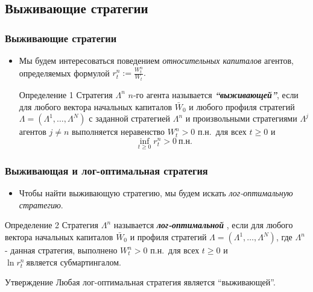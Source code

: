 \documentclass[aspectratio=169]{beamer}
\theoremstyle{definition}
\theoremstyle{remark}
\begin{document}
\subsection{Выживающие стратегии}
\begin{frame}\frametitle{Выживающие стратегии}
    \begin{itemize}
	\item Мы будем интересоваться поведением \textit{относительных капиталов} агентов, определяемых формулой $r_t^n := \frac{W_t^n}{W_t}.$

	\begin{block}{Определение 1}
    Стратегия $\Lambda^n$ $n$-го агента называется \emph{\bf ``выживающей''}, если для любого вектора начальных капиталов $\bar W_0$ и любого профиля стратегий $\Lambda=(\Lambda^1,\ldots,\Lambda^N)$ с заданной стратегией $\Lambda^n$ и произвольными стратегиями $\Lambda^j$ агентов $j\neq n$ выполняется неравенство $W_t^n > 0$ п.н.\ для всех $t\ge 0$ и 
    \[\inf_{t\ge 0} r_t^n > 0\ \text{п.н.} \]
	\end{block}
    \end{itemize}
\end{frame}


\begin{frame}\frametitle{Выживающая и лог-оптимальная стратегия}
    \begin{itemize}
    \item Чтобы найти выживающую стратегию, мы будем искать \emph{лог-оптимальную стратегию}.
    \end{itemize}
    
    \begin{block}{Определение 2}
    Стратегия $\Lambda^n$ называется \emph{\bf лог-оптимальной }, если  для любого вектора начальных капиталов $\bar W_0$ и профиля стратегий $\Lambda=(\Lambda^1,\ldots,\Lambda^N)$, где $\Lambda^n$ - данная стратегия, выполнено $W_t^n > 0$ п.н.\ для всех $t\ge 0$ и $\ln r_t^n\ \text{является субмартингалом}.$
    \end{block}

    \begin{block}{Утверждение}
    Любая лог-оптимальная стратегия является “выживающей”.
    \end{block}
\end{frame}
\end{document}
